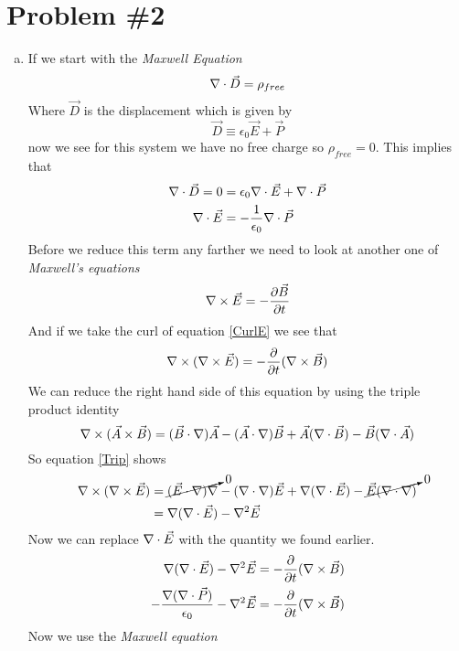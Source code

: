 \documentclass[11pt]{article}
\numberwithin{equation}{section}
\newcommand{\grad}{\bold\nabla}
\newcommand{\vecE}{\vec{E}}
\begin{document}
\section{Problem \#2}
\begin{enumerate}[(a)]
\item
If we start with the \emph{Maxwell Equation}
\begin{equation}
\grad\cdot\vec{D} = \rho_{free}
\label{GradD}
\end{equation}
Where $\vec{D}$ is the displacement which is given by
$$\vec{D}\equiv\epsilon_0\vec{E}+\vec{P}$$
now we see for this system we have no free charge so $\rho_{free} = 0$. This implies that
\begin{align*}
\grad\cdot\vec{D} = 0 &= \epsilon_0\grad\cdot\vec{E}+\grad\cdot\vec{P}\\
\grad\cdot\vec{E} &= -\frac{1}{\epsilon_0}\grad\cdot\vec{P}
\end{align*}
Before we reduce this term any farther we need to look at another one of \emph{Maxwell's equations}
\begin{equation}
\grad\times\vec{E}=-\frac{\partial \vec{B}}{\partial t}
\label{CurlE}
\end{equation}
And if we take the curl of equation \ref{CurlE} we see that
$$\grad\times(\grad\times\vec{E}) =-\frac{\partial}{\partial t}(\grad\times\vec{B})$$
We can reduce the right hand side of this equation by using the triple product identity 
\begin{equation}
\grad\times(\vec{A}\times\vec{B}) = (\vec{B}\cdot\grad)\vec{A}-(\vec{A}\cdot\grad)\vec{B} + \vec{A}(\grad\cdot\vec{B})-\vec{B}(\grad\cdot\vec{A})
\label{Trip}
\end{equation}
So equation \ref{Trip} shows
\begin{align*}
\grad\times(\grad\times\vec{E}) &= \cancelto{0}{(\vec{E}\cdot\grad)\grad}-(\grad\cdot\grad)\vec{E} + \grad(\grad\cdot\vec{E})-\cancelto{0}{\vec{E}(\grad\cdot\grad)}\\
&= \grad(\grad\cdot\vec{E}) - \grad^2\vec{E}
\end{align*}
Now we can replace $\grad\cdot\vecE$ with the quantity we found earlier.
\begin{align*}
\grad(\grad\cdot\vec{E}) - \grad^2\vec{E}=-\frac{\partial}{\partial t}(\grad\times\vec{B})\\
-\frac{\grad(\grad\cdot\vec{P})}{\epsilon_0} - \grad^2\vec{E}=-\frac{\partial}{\partial t}(\grad\times\vec{B})
\end{align*}
Now we use the \emph{Maxwell equation}

\end{enumerate}
\end{document}
